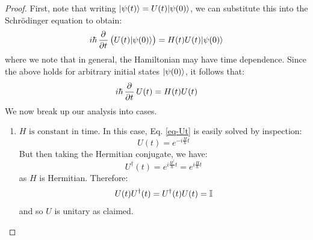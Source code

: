 \begin{proof}
    First, note that writing $\lvert \psi(t) \rangle = U(t)\lvert \psi(0) \rangle$, we can substitute this into the Schr\"{o}dinger equation to obtain:
    \begin{equation}
        i\hbar\dpd{}{t}\left(U(t)\ket{\psi(0)}\right) = H(t)U(t)\ket{\psi(0)}
    \end{equation}
    where we note that in general, the Hamiltonian may have time dependence. Since the above holds for arbitrary initial states $\lvert \psi(0) \rangle$, it follows that:
    \begin{equation}\label{eq-Ut}
        i\hbar\dpd{}{t}U(t) = H(t)U(t)
    \end{equation}
    We now break up our analysis into cases.
    \begin{enumerate}
        \item $\boxed{H \text{ is constant in time}}$. In this case, Eq. \eqref{eq-Ut} is easily solved by inspection:
        \begin{equation}\label{eq-UtHtimeindep}
            U(t) = e^{-i\frac{H}{\hbar}t}
        \end{equation}
        But then taking the Hermitian conjugate, we have:
        \begin{equation}
            U^\dag(t) = e^{i\frac{H^\dag}{\hbar}t} = e^{i\frac{H}{\hbar}t}
        \end{equation}
        as $H$ is Hermitian. Therefore:
        \begin{equation}
            U(t)U^\dag(t) = U^\dag(t) U(t) = \mathbb{I}
        \end{equation}
        and so $U$ is unitary as claimed.


\end{enumerate}
\end{proof}
